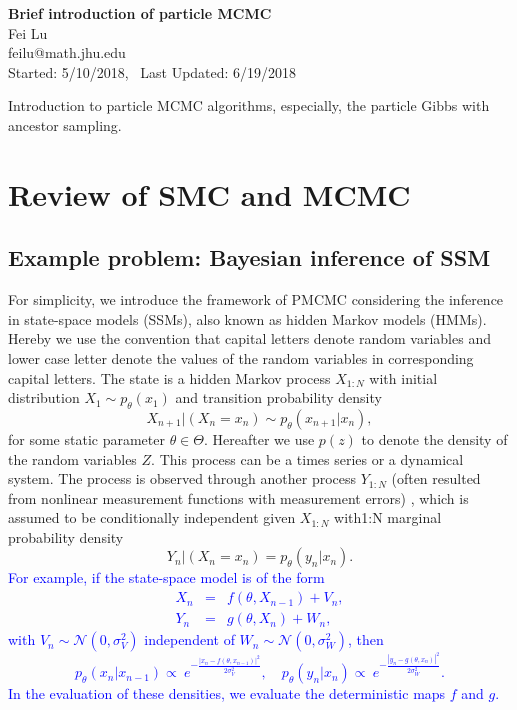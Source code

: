 \documentclass[12pt]{article}
\newcommand{\fblue}[1]{\textcolor{blue}{{#1}}}
\begin{document}
\begin{center}
\textbf{\Large Brief introduction of particle MCMC} \\[0pt]
\vspace{4mm} Fei Lu\\
 feilu@math.jhu.edu \\
 Started: 5/10/2018, \ Last Updated:  6/19/2018
\end{center}

 Introduction to particle MCMC algorithms\cite{andrieu2010particle}, especially, the particle Gibbs with ancestor sampling\cite{lindsten2014particle}. 


 \tableofcontents
 
 
\vspace{6mm}
%
\section{Review of SMC and MCMC}
%
\subsection{Example problem: Bayesian inference of SSM}
For simplicity, we introduce the framework of PMCMC considering the inference in state-space models (SSMs), also known as hidden Markov models (HMMs). Hereby we use the convention that capital letters denote random variables and lower case letter denote the values of the random variables in corresponding capital letters. The state is a hidden Markov process $X_{1:N}$ with initial distribution $X_1\sim p_\theta(x_1)$ and transition probability density 
\[
X_{n+1} | (X_n=x_n) \sim p_\theta(x_{n+1}|x_n),
\]
for some static parameter $\theta\in \Theta$. Hereafter we use $p(z)$ to denote the density of the random variables $Z$.  This process can be a times series or a dynamical system. The process is observed through another process $Y_{1:N}$ (often resulted from nonlinear measurement functions with measurement errors) , which is assumed to be conditionally independent given $X_{1:N}$ with1:N marginal probability density 
\[
Y_n| (X_n=x_n) = p_\theta(y_n|x_n).
\]
\fblue{For example, if the state-space model is of the form
\begin{eqnarray}
X_{n} &=&f(\theta,X_{n-1})+V_{n},  \label{nMM}
\\
Y_{n} &=&g(\theta, X_{n})+W_{n}, \label{obs}
\end{eqnarray}%
with $V_n\sim \mathcal{N}(0,\sigma^2_V)$ independent of $W_n\sim \mathcal{N}(0,\sigma^2_W)$, then 
\[
 p_\theta(x_{n}|x_{n-1}) \propto \  e^{-\frac{|x_{n}- f(\theta,x_{n-1})|^2}{2\sigma^2_V}}, \quad  
 p_\theta(y_n|x_n) \propto \  e^{-\frac{|y_{n}- g(\theta,x_{n})|^2}{2\sigma^2_W}}.
\]
In the evaluation of these densities, we evaluate the deterministic maps $f$ and $g$.
}
\end{document}
